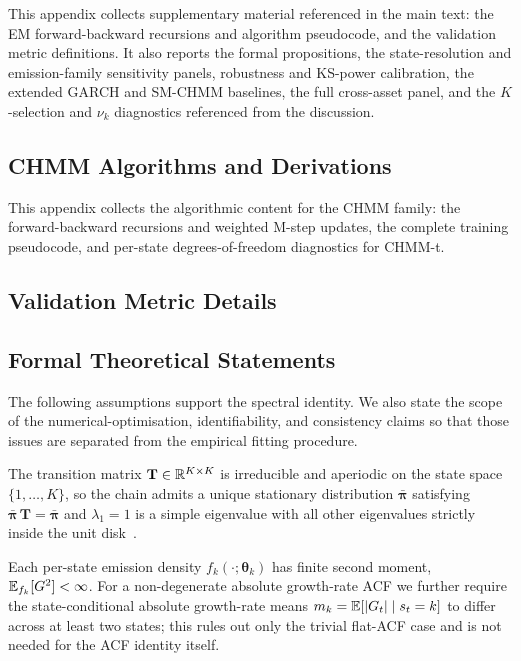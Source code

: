 This appendix collects supplementary material referenced in the main text: the EM forward-backward recursions and algorithm pseudocode, and the validation metric definitions. It also reports the formal propositions, the state-resolution and emission-family sensitivity panels, robustness and KS-power calibration, the extended GARCH and SM-CHMM baselines, the full cross-asset panel, and the $K$-selection and $\nu_k$ diagnostics referenced from the discussion.

\subsection{CHMM Algorithms and Derivations}
\label{sec:supp_algorithms}

This appendix collects the algorithmic content for the CHMM family: the forward-backward recursions and weighted M-step updates, the complete training pseudocode, and per-state degrees-of-freedom diagnostics for CHMM-t.



\subsection{Validation Metric Details}
\label{sec:supp_metrics}


\subsection{Formal Theoretical Statements}
\label{sec:supp_propositions}

The following assumptions support the spectral identity. We also state the scope of the numerical-optimisation, identifiability, and consistency claims so that those issues are separated from the empirical fitting procedure.

\begin{assumption}
\label{ass:irred}
The transition matrix $\mathbf T \in \mathbb{R}^{K \times K}$ is irreducible and aperiodic on the state space $\{1, \ldots, K\}$, so the chain admits a unique stationary distribution $\bar{\boldsymbol\pi}$ satisfying $\bar{\boldsymbol\pi}\,\mathbf T = \bar{\boldsymbol\pi}$ and $\lambda_1 = 1$ is a simple eigenvalue with all other eigenvalues strictly inside the unit disk~\citep{levinperes2017markov}.
\end{assumption}

\begin{assumption}
\label{ass:moments}
Each per-state emission density $f_k(\cdot;\boldsymbol\theta_k)$ has finite second moment, $\mathbb{E}_{f_k}[G^2] < \infty$. For a non-degenerate absolute growth-rate ACF we further require the state-conditional absolute growth-rate means $m_k = \mathbb{E}[|G_t| \mid s_t = k]$ to differ across at least two states; this rules out only the trivial flat-ACF case and is not needed for the ACF identity itself.
\end{assumption}

